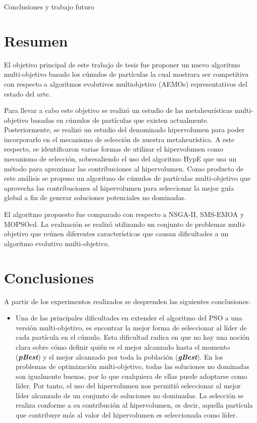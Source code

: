 \begin{chapter}{Conclusiones y trabajo futuro}
  
  \section{Resumen}
  
  El objetivo principal de este trabajo de tesis fue proponer un nuevo algoritmo multi-objetivo basado los c\'umulos de 
  part\'iculas la cual mostrara ser competitiva con respecto a algoritmos evolutivos multiobjetivo (AEMOs) representativos del estado 
  del arte.

  Para llevar a cabo este objetivo se realiz\'o un estudio de las metaheur\'isticas multi-objetivo basadas en 
  c\'umulos de part\'iculas que existen actualmente. Posteriormente, se realiz\'o un estudio del denominado hipervolumen 
  para poder incorporarlo en el mecanismo de selecci\'on de nuestra metaheur\'istica. A este respecto, se identificaron
  varias formas de utilizar el hipervolumen como mecanismo de selecci\'on, sobresaliendo
  el uso del algoritmo HypE que usa un m\'etodo para aproximar las contribuciones al hipervolumen. 
  Como producto de este an\'alisis se propuso un algoritmo de c\'umulos de part\'iculas multi-objetivo que aprovecha las contribuciones al 
  hipervolumen para seleccionar la mejor gu\'ia global a fin de generar soluciones potenciales no dominadas.

  El algoritmo propuesto fue comparado con respecto a NSGA-II, SMS-EMOA y MOPSOcd. La evaluaci\'on se realiz\'o utilizando un conjunto 
  de problemas multi-objetivo que re\'unen diferentes 
  caracter\'isticas que causan dificultades a un algoritmo evolutivo multi-objetivo.
  
  \section{Conclusiones}
  
  A partir de los experimentos realizados se desprenden las siguientes conclusiones:

  \begin{itemize}
  \item Una de las principales dificultades en extender el algoritmo del PSO a una versi\'on multi-objetivo, es encontrar la mejor 
  forma de seleccionar al l\'ider de cada part\'icula en el c\'umulo. Esta dificultad radica en que no hay una noci\'on clara sobre 
  c\'omo definir qui\'en es el mejor alcanzado hasta el momento (\textbf{\textit{pBest}}) y el mejor 
  alcanzado por toda la poblaci\'on (\textbf{\textit{gBest}}). En los problemas de optimizaci\'on multi-objetivo, 
  todas las soluciones no dominadas son igualmente buenas, por lo que cualquiera de ellas puede adoptarse como l\'ider. Por tanto, el 
  uso del hipervolumen nos permiti\'o seleccionar al mejor l\'ider alcanzado de un conjunto de soluciones no dominadas. La selecci\'on
  se realiza conforme a su contribuci\'on al hipervolumen, es decir, aquella part\'icula que contribuye m\'as al valor del hipervolumen
  es seleccionada como l\'ider.
  

\end{itemize}
\end{chapter}
